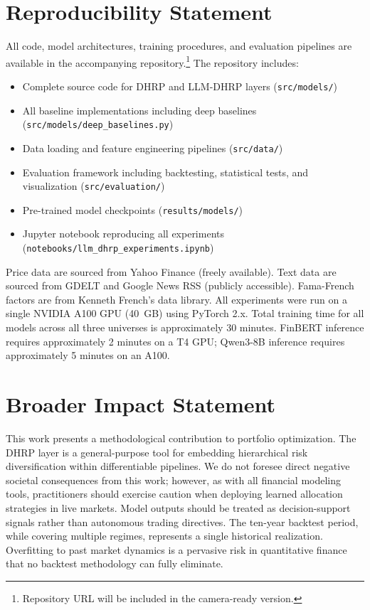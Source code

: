 \section{Reproducibility Statement}
\label{app:reproducibility}

All code, model architectures, training procedures, and evaluation pipelines are available in the accompanying repository.\footnote{Repository URL will be included in the camera-ready version.} The repository includes:
\begin{itemize}
\item Complete source code for DHRP and LLM-DHRP layers (\texttt{src/models/})
\item All baseline implementations including deep baselines (\texttt{src/models/deep\_baselines.py})
\item Data loading and feature engineering pipelines (\texttt{src/data/})
\item Evaluation framework including backtesting, statistical tests, and visualization (\texttt{src/evaluation/})
\item Pre-trained model checkpoints (\texttt{results/models/})
\item Jupyter notebook reproducing all experiments (\texttt{notebooks/llm\_dhrp\_experiments.ipynb})
\end{itemize}

Price data are sourced from Yahoo Finance (freely available). Text data are sourced from GDELT and Google News RSS (publicly accessible). Fama-French factors are from Kenneth French's data library. All experiments were run on a single NVIDIA A100 GPU (40~GB) using PyTorch 2.x. Total training time for all models across all three universes is approximately 30 minutes. FinBERT inference requires approximately 2 minutes on a T4 GPU; Qwen3-8B inference requires approximately 5 minutes on an A100.

\section{Broader Impact Statement}
\label{app:impact}

This work presents a methodological contribution to portfolio optimization. The DHRP layer is a general-purpose tool for embedding hierarchical risk diversification within differentiable pipelines. We do not foresee direct negative societal consequences from this work; however, as with all financial modeling tools, practitioners should exercise caution when deploying learned allocation strategies in live markets. Model outputs should be treated as decision-support signals rather than autonomous trading directives. The ten-year backtest period, while covering multiple regimes, represents a single historical realization. Overfitting to past market dynamics is a pervasive risk in quantitative finance that no backtest methodology can fully eliminate.


